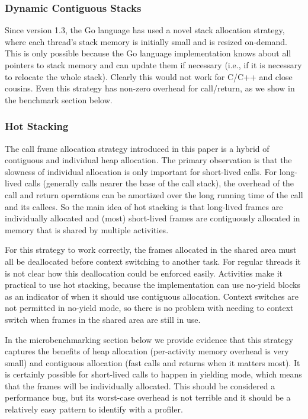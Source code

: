 \documentclass[9pt,preprint]{sigplanconf}
\begin{document}

\subsubsection{Dynamic Contiguous Stacks}

Since version 1.3, the Go language has used a novel stack allocation strategy, where each thread's stack memory is initially small and is resized on-demand.
This is only possible because the Go language implementation knows about all pointers to stack memory and can update them if necessary (i.e., if it is necessary to relocate the whole stack).
Clearly this would not work for C/C++ and close cousins.
Even this strategy has non-zero overhead for call/return, as we show in the benchmark section below.

\subsubsection{Hot Stacking}

The call frame allocation strategy introduced in this paper is a hybrid of contiguous and individual heap allocation.
The primary observation is that the slowness of individual allocation is only important for short-lived calls.
For long-lived calls (generally calls nearer the base of the call stack), the overhead of the call and return operations can be amortized over the long running time of the call and its callees.
So the main idea of hot stacking is that long-lived frames are individually allocated and (most) short-lived frames are contiguously allocated in memory that is shared by multiple activities.

For this strategy to work correctly, the frames allocated in the shared area must all be deallocated before context switching to another task.
For regular threads it is not clear how this deallocation could be enforced easily.
Activities make it practical to use hot stacking, because the implementation can use no-yield blocks as an indicator of when it should use contiguous allocation.
Context switches are not permitted in no-yield mode, so there is no problem with needing to context switch when frames in the shared area are still in use.

In the microbenchmarking section below we provide evidence that this strategy captures the benefits of heap allocation (per-activity memory overhead is very small) and contiguous allocation (fast calls and returns when it matters most).
It is certainly possible for short-lived calls to happen in yielding mode, which means that the frames will be individually allocated.
This should be considered a performance bug, but its worst-case overhead is not terrible and it should be a relatively easy pattern to identify with a profiler.
\end{document}
